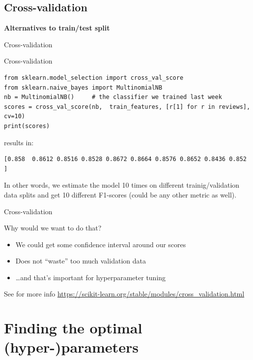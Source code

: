 \documentclass{beamer}
\begin{document}
\subsection{Cross-validation}

\begin{frame}[plain]
\textbf{Alternatives to train/test split}

Cross-validation
\end{frame}

\begin{frame}[fragile]{Cross-validation}
\begin{lstlisting}
from sklearn.model_selection import cross_val_score
from sklearn.naive_bayes import MultinomialNB
nb = MultinomialNB()     # the classifier we trained last week
scores = cross_val_score(nb,  train_features, [r[1] for r in reviews], cv=10)
print(scores)
\end{lstlisting}

results in:

\begin{lstlisting}
[0.858  0.8612 0.8516 0.8528 0.8672 0.8664 0.8576 0.8652 0.8436 0.852 ]
\end{lstlisting}

In other words, we estimate the model 10 times on different trainig/validation data splits and get 10 different F1-scores (could be any other metric as well).

\end{frame}


\begin{frame}{Cross-validation}
\begin{block}{Why would we want to do that?}
\begin{itemize}
	\item We could get some confidence interval around our scores
	\item Does not ``waste'' too much validation data
	\item \ldots and that's important for hyperparameter tuning
\end{itemize}
	
\end{block}

{\footnotesize See for more info
\url{https://scikit-learn.org/stable/modules/cross\_validation.html}}
\end{frame}





\section{Finding the optimal (hyper-)parameters}
\end{document}
